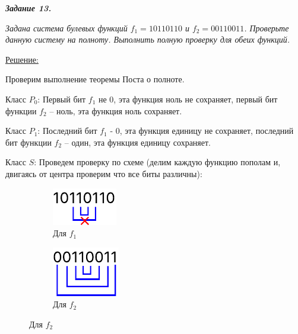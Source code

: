 \documentclass[12pt]{article}
\begin{document}
\textit{\textbf{Задание 13.}}

\textit{Задана система булевых функций $f_1=10110110$ и $f_2=00110011$. Проверьте
данную систему на полноту. Выполнить полную проверку для обеих функций.}

\underline{Решение:}

Проверим выполнение теоремы Поста о полноте.

Класс $P_0$: Первый бит $f_1$ не 0, эта функция ноль не сохраняет, первый бит
функции $f_2$ – ноль, эта функция ноль сохраняет.

Класс $P_1$: Последний бит $f_1$ - 0, эта функция единицу не сохраняет,
последний бит функции $f_2$ – один, эта функция единицу сохраняет.

Класс $S$: Проведем проверку по схеме (делим каждую функцию пополам
и, двигаясь от центра проверим что все биты различны):

\begin{figure}[h]
        \captionsetup[subfigure]{labelformat=empty}
        \centering
        \begin{subfigure}{.32\textwidth}
                \centering
                \includegraphics[width=1\linewidth]{13_1.pdf}
                \caption{Для $f_1$}
        \end{subfigure}
        \begin{subfigure}{.32\textwidth}
                \centering
                \includegraphics[width=1\linewidth]{13_2.pdf}
                \caption{Для $f_2$}
        \end{subfigure}
\end{figure}
\end{document}
